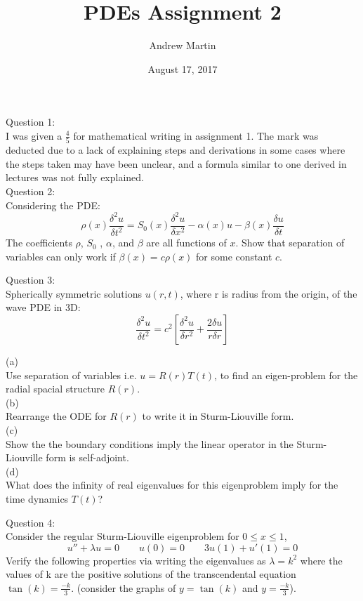 \documentclass[a4paper]{article}
\begin{document}
	\title{PDEs Assignment 2}
	\date{August 17, 2017}
	\author{Andrew Martin}
	
	\maketitle
	
	Question 1:\\
	I was given a $\frac{4}{5}$ for mathematical writing in assignment 1.
	The mark was deducted due to a lack of explaining steps and derivations in some cases where the steps taken may have been unclear, and a formula similar to one derived in lectures was not fully explained.\\
	
	
	\newpage
	Question 2:\\
	Considering the PDE:
	$$\rho (x) \frac{\delta ^2 u}{\delta t ^2} = S_0(x)\frac{\delta ^2 u}{\delta x ^2}-\alpha(x)u-\beta(x)\frac{\delta u}{\delta t}$$
	The coefficients $\rho$, $S_0$ , $\alpha$, and $\beta$ are all functions of $x$. Show that separation of variables can only work if $\beta (x) = c\rho(x)$ for some constant $c$.
	
	
	\newpage
	Question 3:\\
	Spherically symmetric solutions $u(r,t)$, where r is radius from the origin, of the wave PDE in 3D:
	$$\frac{\delta ^2 u}{\delta t ^2}=c^2\left[\frac{\delta ^2 u}{\delta r ^2}+\frac{2\delta u}{r \delta r }\right]$$
	
	(a)\\
	Use separation of variables i.e. $u=R(r)T(t)$, to find an eigen-problem for the radial spacial structure $R(r)$.\\
	
	(b)\\
	Rearrange the ODE for $R(r)$ to write it in Sturm-Liouville form.\\
	
	(c)\\
	Show the the boundary conditions imply the linear operator in the Sturm-Liouville form is self-adjoint.\\
	
	(d)\\
	What does the infinity of real eigenvalues for this eigenproblem imply for the time dynamics $T(t)$?
	
	
	\newpage
	Question 4:\\
	Consider the regular Sturm-Liouville eigenproblem for $0 \leq x \leq 1$,
	$$u''+\lambda u = 0 \qquad u(0)=0 \qquad 3u(1)+u'(1)=0$$
	Verify the following properties via writing the eigenvalues as $\lambda = k^2$ where the values of k are the positive solutions of the transcendental equation $\tan(k)=\frac{-k}{3}$. (consider the graphs of $y=\tan(k)$ and $y=\frac{-k}{3}$).\\
	
\end{document}
